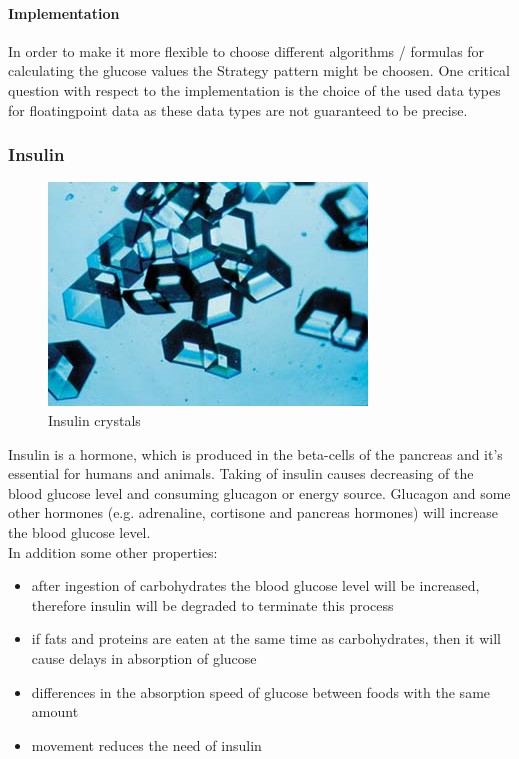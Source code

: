 \paragraph{Implementation}
In order to make it more flexible to choose different algorithms / formulas for
calculating the glucose values the Strategy pattern might be choosen. One
critical question with respect to the implementation is the choice of the used
data types for floatingpoint data as these data types are not guaranteed to be precise.

\subsubsection{Insulin}
\begin{figure}[htb]
\centering
\includegraphics[width=\textwidth]{images/Insulincrystals.jpg}
\caption{Insulin crystals}
\end{figure}
Insulin is a hormone, which is produced in the beta-cells of the pancreas and it's essential for humans and animals. 
Taking of insulin causes decreasing of the blood glucose level and consuming glucagon or energy source. 
Glucagon and some other hormones (e.g. adrenaline, cortisone and pancreas hormones) will increase the blood glucose level.\\
\newpage
In addition some other properties:
\begin{itemize}
  \item after ingestion of carbohydrates the blood glucose level will be increased, 
	  therefore insulin will be degraded to terminate this process
  \item if fats and proteins are eaten at the same time as carbohydrates, 
	  then it will cause delays in absorption of glucose
  \item differences in the absorption speed of glucose between foods with the same amount
  \item movement reduces the need of insulin
\end{itemize}
